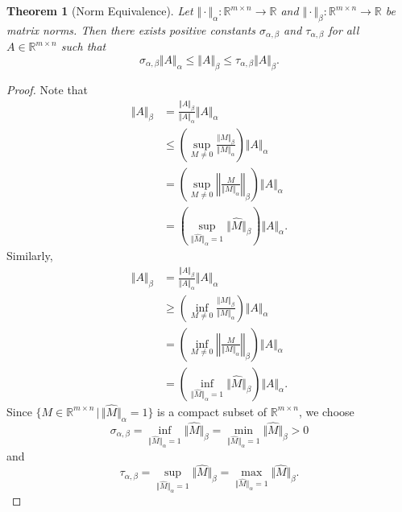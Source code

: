 \documentclass[12pt]{article}
\newtheorem{theorem}{Theorem}[subsection]
\theoremstyle{definition}
\begin{document}
\begin{theorem}[Norm Equivalence] \label{thm:norm_equivalence}
    Let $\Vert\cdot\Vert_\alpha: \mathbb{R}^{m\times n} \to \mathbb{R}$ and $\Vert\cdot\Vert_\beta: \mathbb{R}^{m\times n} \to \mathbb{R}$ be matrix norms. Then there exists positive constants $\sigma_{\alpha,\beta}$ and $\tau_{\alpha,\beta}$ for all $A\in\mathbb{R}^{m\times n}$ such that
    \[ \sigma_{\alpha,\beta} \Vert A\Vert_\alpha
    \leq \Vert A\Vert_\beta
    \leq \tau_{\alpha,\beta} \Vert A\Vert_\beta
    .
    \]
\end{theorem}
\begin{proof}
    Note that
    \[ 
    \begin{aligned}
        \Vert A\Vert_\beta
        &= \frac{\Vert A\Vert_\beta}{\Vert A\Vert_\alpha} \Vert A\Vert_\alpha \\
        &\leq \left( \sup_{M\neq0} \frac{\Vert M\Vert_\beta}{\Vert M\Vert_\alpha} \right) \Vert A\Vert_\alpha \\
        &= \left( \sup_{M\neq0} \left\Vert \frac{M}{\Vert M\Vert_\alpha} \right\Vert_\beta \right) \Vert A\Vert_\alpha \\
        &= \left( \sup_{\Vert\hat{M}\Vert_\alpha=1} \Vert\hat{M}\Vert_\beta \right) \Vert A\Vert_\alpha.
    \end{aligned}
    \]
    Similarly,
    \[ 
    \begin{aligned}
        \Vert A\Vert_\beta
        &= \frac{\Vert A\Vert_\beta}{\Vert A\Vert_\alpha} \Vert A\Vert_\alpha \\
        &\geq \left( \inf_{M\neq0} \frac{\Vert M\Vert_\beta}{\Vert M\Vert_\alpha} \right) \Vert A\Vert_\alpha \\
        &= \left( \inf_{M\neq0} \left\Vert \frac{M}{\Vert M\Vert_\alpha} \right\Vert_\beta \right) \Vert A\Vert_\alpha \\
        &= \left( \inf_{\Vert\hat{M}\Vert_\alpha=1} \Vert\hat{M}\Vert_\beta \right) \Vert A\Vert_\alpha.
    \end{aligned}
    \]
    Since $\{ M\in\mathbb{R}^{m\times n} \,|\, \Vert\hat{M}\Vert_\alpha = 1 \}$ is a compact subset of $\mathbb{R}^{m\times n}$, we choose
    \[ 
    \sigma_{\alpha,\beta} 
    = \inf_{\Vert\hat{M}\Vert_\alpha=1} \Vert\hat{M}\Vert_\beta
    = \min_{\Vert\hat{M}\Vert_\alpha=1} \Vert\hat{M}\Vert_\beta
    > 0
    \]
    and
    \[
    \tau_{\alpha,\beta} 
    = \sup_{\Vert\hat{M}\Vert_\alpha=1} \Vert\hat{M}\Vert_\beta
    = \max_{\Vert\hat{M}\Vert_\alpha=1} \Vert\hat{M}\Vert_\beta.
    \]
\end{proof}
\end{document}
